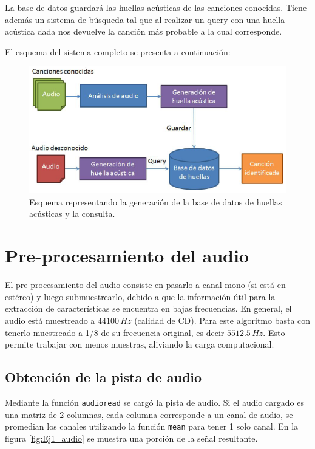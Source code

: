 \documentclass[10pt,spanish,a4paper,openany,notitlepage]{article}
\begin{document}
La base de datos guardará las huellas acústicas de las canciones conocidas. Tiene además
un sistema de búsqueda tal que al realizar un query con una huella acústica dada 
nos devuelve la canción más probable a la cual corresponde.

El esquema del sistema completo se presenta a continuación:

\begin{figure}[H] %
\begin{center}
\includegraphics[scale=0.8]{./imagenes/esquema.png}
\caption{Esquema representando la generación de la base de datos de huellas acústicas y la consulta.}
 \label{fig:esquema}
\end{center}
\end{figure}

\section{Pre-procesamiento del audio}

El pre-procesamiento del audio consiste en pasarlo a canal mono (si
está en estéreo) y luego submuestrearlo, debido a que la información
útil para la extracción de características se encuentra en bajas frecuencias.
En general, el audio está muestreado a $44100\, \unit{Hz}$ (calidad de CD).
Para este algoritmo basta con tenerlo muestreado a 1/8 de su frecuencia original,
es decir $5512.5\, \unit{Hz}$. Esto permite trabajar con menos muestras, aliviando la
carga computacional.

\subsection{Obtención de la pista de audio}

Mediante la función \texttt{audioread} se cargó la pista de audio.
Si el audio cargado es una matriz de 2 columnas, cada columna corresponde
a un canal de audio, se promedian los canales utilizando la función
\texttt{mean} para tener 1 solo canal.
En la figura \ref{fig:Ej1_audio} se muestra una porción de la señal resultante.
\end{document}

